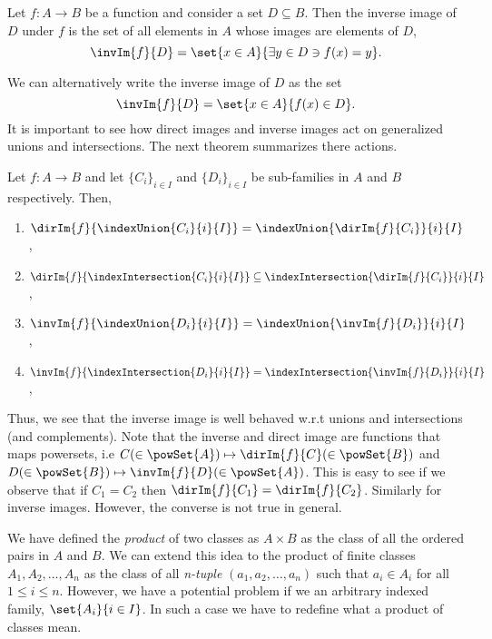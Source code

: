 \begin{Definition}
    Let $f : A \to B$ be a function and consider a set $D \subseteq B$. Then the inverse image of $D$
    under $f$ is the set of all elements in $A$ whose images are elements of $D$,
    \begin{equation*}
	\invIm{f}{D} = \set{x \in A}{\exists y \in D \ni f(x) = y}.
    \end{equation*}
\end{Definition}
We can alternatively write the inverse image of $D$ as the set 
\[\invIm{f}{D} = \set{x \in A}{f(x) \in D}.\]
It is important to see how direct images and inverse images act on generalized unions and
intersections. The next theorem summarizes there actions.
\begin{Theorem}
    Let $f : A \to B$ and let ${\lbrace C_i \rbrace}_{i \in I}$ and 
    ${\lbrace D_i \rbrace}_{i \in I}$ be sub-families in $A$ and $B$ respectively. Then,
    \begin{enumerate}
	\item $\dirIm{f}{\indexUnion{C_i}{i}{I}} = \indexUnion{\dirIm{f}{C_i}}{i}{I}$,
	\item $\dirIm{f}{\indexIntersection{C_i}{i}{I}} \subseteq \indexIntersection{\dirIm{f}{C_i}}{i}{I}$,
	\item $\invIm{f}{\indexUnion{D_i}{i}{I}} = \indexUnion{\invIm{f}{D_i}}{i}{I}$,
	\item $\invIm{f}{\indexIntersection{D_i}{i}{I}} = \indexIntersection{\invIm{f}{D_i}}{i}{I}$,
    \end{enumerate}
\end{Theorem}
Thus, we see that the inverse image is well behaved w.r.t unions and intersections (and
complements). Note that the inverse and direct image are functions that maps powersets, i.e
$C(\in \powSet{A}) \mapsto \dirIm{f}{C}(\in \powSet{B})$ and $D (\in \powSet{B}) 
\mapsto \invIm{f}{D} (\in \powSet{A})$. This is easy to see if we observe that if $C_1 = C_2$ then
$\dirIm{f}{C_1} = \dirIm{f}{C_2}$. Similarly for inverse images. However, the converse 
is not true in general.

We have defined the \emph{product} of two classes as $A \times B$ as the class of all the ordered
pairs in $A$ and $B$. We can extend this idea to the product of finite classes $A_1,A_2,\dots,A_n$
as the class of all \emph{n-tuple} $(a_1,a_2,\dots,a_n)$ such that $a_i \in A_i$ for all $1\leq i
\leq n$. However, we have a potential problem if we an arbitrary indexed family, 
$\set{A_i}{i\in I}$. In such a case we have to redefine what a product of classes mean.

